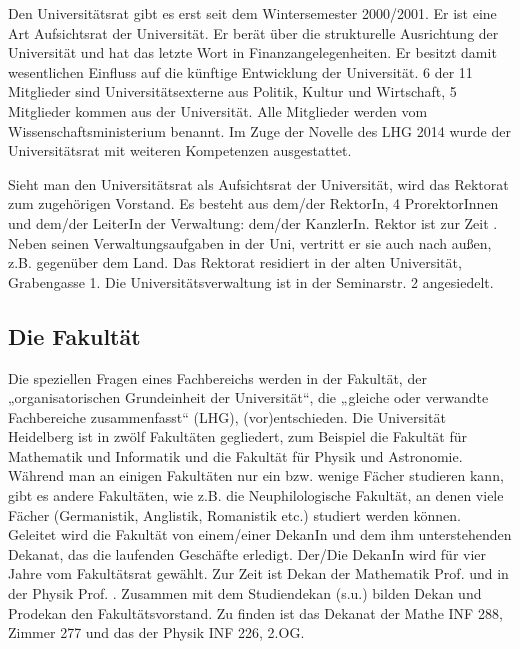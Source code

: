 Den Universitätsrat gibt es erst seit dem Wintersemester 2000/2001. Er ist
eine Art Aufsichtsrat der Universität. Er berät über die strukturelle
Ausrichtung der Universität und hat das letzte Wort in
Finanzangelegenheiten. Er besitzt damit wesentlichen Einfluss auf die
künftige Entwicklung der Universität. 6 der 11 Mitglieder sind
Universitätsexterne aus Politik, Kultur und Wirtschaft, 5 Mitglieder
kommen aus der Universität. Alle Mitglieder werden vom
Wissenschaftsministerium benannt. Im Zuge der Novelle des LHG 2014 wurde
der Universitätsrat mit weiteren Kompetenzen ausgestattet.

Sieht man den Universitätsrat als Aufsichtsrat der Universität, wird das
Rektorat zum zugehörigen Vorstand. Es besteht aus dem/der RektorIn, 4
ProrektorInnen und dem/der LeiterIn der Verwaltung: dem/der KanzlerIn.
Rektor ist zur Zeit \rektor . Neben seinen Verwaltungsaufgaben in
der Uni, vertritt er sie auch nach außen, z.B. gegenüber dem Land. Das
Rektorat residiert in der alten Universität, Grabengasse 1. Die
Universitätsverwaltung ist in der Seminarstr. 2 angesiedelt.

\subsection{Die Fakultät}

Die speziellen Fragen eines Fachbereichs werden in der Fakultät, der
„organisatorischen Grundeinheit der Universität“, die „gleiche oder
verwandte Fachbereiche zusammenfasst“ (LHG), (vor)entschieden. Die
Universität Heidelberg ist in zwölf Fakultäten gegliedert, zum Beispiel 
die Fakultät für Mathematik und Informatik und die Fakultät für Physik und 
Astronomie. Während man an einigen Fakultäten nur ein bzw. wenige Fächer studieren
kann, gibt es andere Fakultäten, wie z.B. die Neuphilologische Fakultät,
an denen viele Fächer (Germanistik, Anglistik, Romanistik etc.) studiert
werden können. Geleitet wird die Fakultät von einem/einer DekanIn und dem
ihm unterstehenden Dekanat, das die laufenden Geschäfte erledigt. Der/Die
DekanIn wird für vier Jahre vom Fakultätsrat gewählt. Zur Zeit ist Dekan der
Mathematik Prof. \dekanmathe{} und in der Physik Prof. \dekanphysik. Zusammen mit dem
Studiendekan (s.u.) bilden Dekan und Prodekan den Fakultätsvorstand. Zu
finden ist das Dekanat der Mathe \gls{INF} 288, Zimmer 277 und das der Physik
INF 226, 2.OG.

